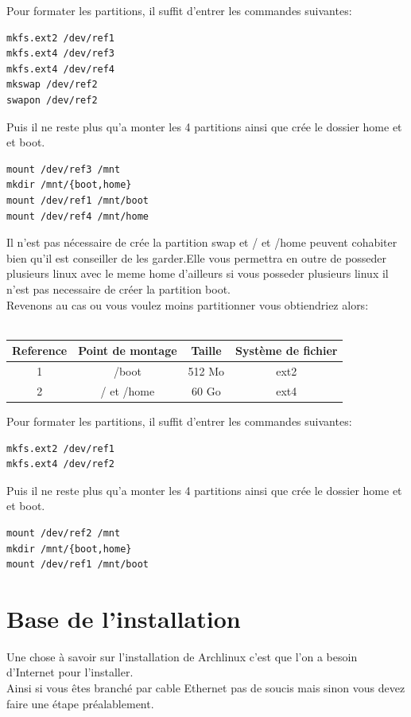 \documentclass[a4paper]{book}
\begin{document}
Pour formater les partitions, il suffit d'entrer les commandes suivantes:
\begin{verbatim}
mkfs.ext2 /dev/ref1
mkfs.ext4 /dev/ref3
mkfs.ext4 /dev/ref4
mkswap /dev/ref2
swapon /dev/ref2
\end{verbatim}
Puis il ne reste plus qu'a monter les 4 partitions ainsi que crée le dossier
home et et boot.
\begin{verbatim}
mount /dev/ref3 /mnt
mkdir /mnt/{boot,home}
mount /dev/ref1 /mnt/boot
mount /dev/ref4 /mnt/home
\end{verbatim}
Il n'est pas nécessaire de crée la partition swap et / et /home peuvent
cohabiter bien qu'il est conseiller de les garder.Elle vous permettra en outre
de posseder plusieurs linux avec le meme home d'ailleurs si vous posseder
plusieurs linux il n'est pas necessaire de créer la partition boot.\\
Revenons au cas ou vous voulez moins partitionner vous obtiendriez alors\@:\\ \\
\begin{tabular}{|c|c|c|c|}
  Reference & Point de montage & Taille & Système de fichier\\
  \hline
  1 & /boot & 512 Mo & ext2 \\
  \hline
  2 & / et /home & 60 Go & ext4\\
\end{tabular}
Pour formater les partitions, il suffit d'entrer les commandes suivantes:
\begin{verbatim}
mkfs.ext2 /dev/ref1
mkfs.ext4 /dev/ref2
\end{verbatim}
Puis il ne reste plus qu'a monter les 4 partitions ainsi que crée le dossier
home et et boot.
\begin{verbatim}
mount /dev/ref2 /mnt
mkdir /mnt/{boot,home}
mount /dev/ref1 /mnt/boot
\end{verbatim}

\chapter{Base de l'installation}
Une chose à savoir sur l'installation de Archlinux c'est que l'on a besoin
d'Internet pour l'installer.\\
Ainsi si vous êtes branch\'e par cable Ethernet pas de soucis mais sinon vous
devez faire une \'etape préalablement.
\end{document}
